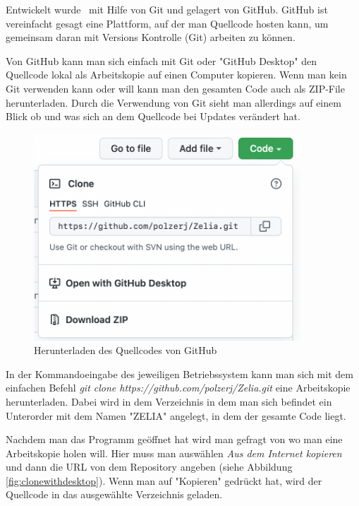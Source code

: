 
Entwickelt wurde \ZELIA\ mit Hilfe von Git und gelagert von GitHub. GitHub ist vereinfacht gesagt eine Plattform, auf der man Quellcode hosten kann, um gemeinsam daran mit Versions Kontrolle (Git) arbeiten zu können. 

Von GitHub kann man sich einfach mit Git oder "GitHub Desktop" den Quellcode lokal als Arbeitskopie auf einen Computer kopieren. Wenn man kein Git verwenden kann oder will kann man den gesamten Code auch als ZIP-File herunterladen. Durch die Verwendung von Git sieht man allerdings auf einem Blick ob und was sich an dem Quellcode bei Updates verändert hat.

\begin{figure}[H]
    \centering
    \includegraphics[width=100mm]{media/Handbuch/GitHub_Download.png}
    \caption{Herunterladen des Quellcodes von GitHub}
\end{figure}


In der Kommandoeingabe des jeweiligen Betriebssystem kann man sich mit dem einfachen Befehl \emph{git clone https://github.com/polzerj/Zelia.git} eine Arbeitskopie herunterladen. Dabei wird in dem Verzeichnis in dem man sich befindet ein Unterorder mit dem Namen "ZELIA" angelegt, in dem der gesamte Code liegt.


Nachdem man das Programm geöffnet hat wird man gefragt von wo man eine Arbeitskopie holen will. Hier muss man auswählen \emph{Aus dem Internet kopieren} und dann die URL von dem Repository angeben (siehe Abbildung \ref{fig:clonewithdesktop}). Wenn man auf "Kopieren" gedrückt hat, wird der Quellcode in das ausgewählte Verzeichnis geladen. 

